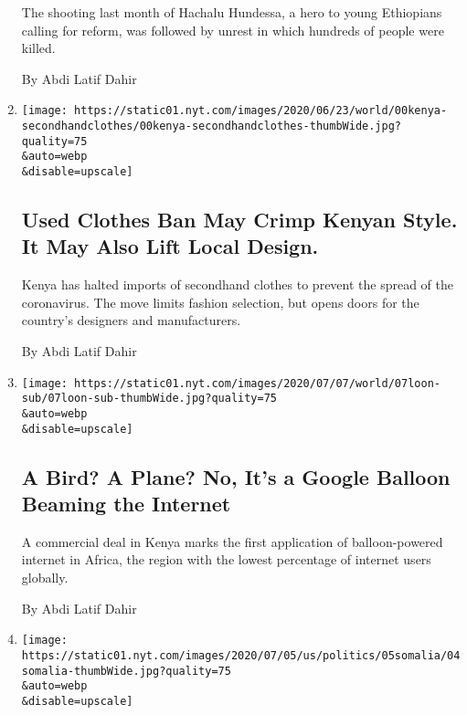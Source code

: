 \begin{enumerate}
  The shooting last month of Hachalu Hundessa, a hero to young
  Ethiopians calling for reform, was followed by unrest in which
  hundreds of people were killed.

  By Abdi Latif Dahir
\item
  \href{/2020/07/09/world/africa/kenya-secondhand-clothes-ban-coronavirus.html}{}

  \texttt{[image: https://static01.nyt.com/images/2020/06/23/world/00kenya-secondhandclothes/00kenya-secondhandclothes-thumbWide.jpg?quality=75\\\&auto=webp\\\&disable=upscale]}

  \hypertarget{used-clothes-ban-may-crimp-kenyan-style-it-may-also-lift-local-design}{%
  \subsection{Used Clothes Ban May Crimp Kenyan Style. It May Also Lift
  Local
  Design.}\label{used-clothes-ban-may-crimp-kenyan-style-it-may-also-lift-local-design}}

  Kenya has halted imports of secondhand clothes to prevent the spread
  of the coronavirus. The move limits fashion selection, but opens doors
  for the country's designers and manufacturers.

  By Abdi Latif Dahir
\item
  \href{/2020/07/07/world/africa/google-loon-balloon-kenya.html}{}

  \texttt{[image: https://static01.nyt.com/images/2020/07/07/world/07loon-sub/07loon-sub-thumbWide.jpg?quality=75\\\&auto=webp\\\&disable=upscale]}

  \hypertarget{a-bird-a-plane-no-its-a-google-balloon-beaming-the-internet}{%
  \subsection{A Bird? A Plane? No, It's a Google Balloon Beaming the
  Internet}\label{a-bird-a-plane-no-its-a-google-balloon-beaming-the-internet}}

  A commercial deal in Kenya marks the first application of
  balloon-powered internet in Africa, the region with the lowest
  percentage of internet users globally.

  By Abdi Latif Dahir
\item
  \href{/2020/07/04/world/africa/somalia-bombing-mogadishu.html}{}

  \texttt{[image: https://static01.nyt.com/images/2020/07/05/us/politics/05somalia/04somalia-thumbWide.jpg?quality=75\\\&auto=webp\\\&disable=upscale]}


\end{enumerate}
